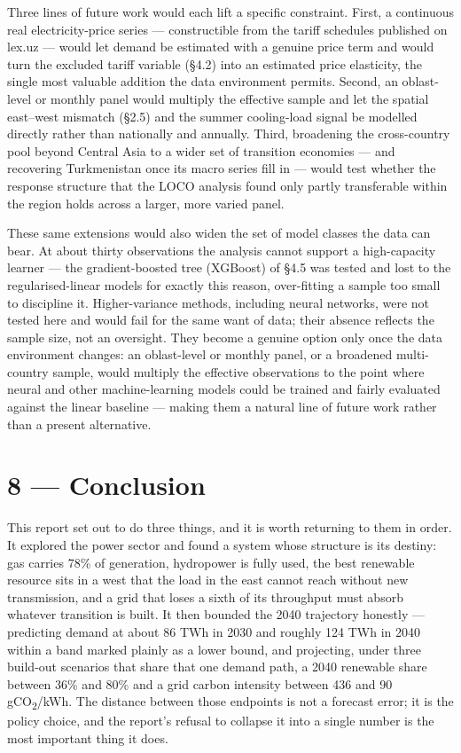 \documentclass[10pt,twocolumn]{article}
\begin{document}
Three lines of future work would each lift a specific constraint. First, a continuous real electricity-price series --- constructible from the tariff schedules published on lex.uz --- would let demand be estimated with a genuine price term and would turn the excluded tariff variable (\S{}4.2) into an estimated price elasticity, the single most valuable addition the data environment permits. Second, an oblast-level or monthly panel would multiply the effective sample and let the spatial east--west mismatch (\S{}2.5) and the summer cooling-load signal be modelled directly rather than nationally and annually. Third, broadening the cross-country pool beyond Central Asia to a wider set of transition economies --- and recovering Turkmenistan once its macro series fill in --- would test whether the response structure that the LOCO analysis found only partly transferable within the region holds across a larger, more varied panel.

These same extensions would also widen the set of model classes the data can bear. At about thirty observations the analysis cannot support a high-capacity learner --- the gradient-boosted tree (XGBoost) of \S{}4.5 was tested and lost to the regularised-linear models for exactly this reason, over-fitting a sample too small to discipline it. Higher-variance methods, including neural networks, were not tested here and would fail for the same want of data; their absence reflects the sample size, not an oversight. They become a genuine option only once the data environment changes: an oblast-level or monthly panel, or a broadened multi-country sample, would multiply the effective observations to the point where neural and other machine-learning models could be trained and fairly evaluated against the linear baseline --- making them a natural line of future work rather than a present alternative.

\section*{8 --- Conclusion}

This report set out to do three things, and it is worth returning to them in order. It explored the power sector and found a system whose structure is its destiny: gas carries 78\% of generation, hydropower is fully used, the best renewable resource sits in a west that the load in the east cannot reach without new transmission, and a grid that loses a sixth of its throughput must absorb whatever transition is built. It then bounded the 2040 trajectory honestly --- predicting demand at about 86 TWh in 2030 and roughly 124 TWh in 2040 within a band marked plainly as a lower bound, and projecting, under three build-out scenarios that share that one demand path, a 2040 renewable share between 36\% and 80\% and a grid carbon intensity between 436 and 90 gCO\textsubscript{2}/kWh. The distance between those endpoints is not a forecast error; it is the policy choice, and the report's refusal to collapse it into a single number is the most important thing it does.
\end{document}
